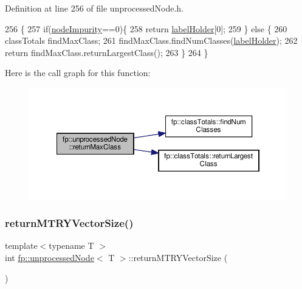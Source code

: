 Definition at line 256 of file unprocessed\+Node.\+h.


\begin{DoxyCode}
256                                            \{
257                     \textcolor{keywordflow}{if}(\hyperlink{classfp_1_1unprocessedNode_a5bb6906b09625f7893bf0ffd512b1714}{nodeImpurity}==0)\{
258                         \textcolor{keywordflow}{return} \hyperlink{classfp_1_1unprocessedNode_a99524f9266d6fcf979f15ef445e629ca}{labelHolder}[0];
259                     \} \textcolor{keywordflow}{else} \{
260                         classTotals findMaxClass;
261                         findMaxClass.findNumClasses(\hyperlink{classfp_1_1unprocessedNode_a99524f9266d6fcf979f15ef445e629ca}{labelHolder});
262                         \textcolor{keywordflow}{return} findMaxClass.returnLargestClass();
263                     \}
264                 \}
\end{DoxyCode}
Here is the call graph for this function\+:\nopagebreak
\begin{figure}[H]
\begin{center}
\leavevmode
\includegraphics[width=350pt]{classfp_1_1unprocessedNode_af038553809a2e6d1cbe04adaba1c6b21_cgraph}
\end{center}
\end{figure}
\mbox{\label{classfp_1_1unprocessedNode_a208170fb33171f64c83839abbf300705}} 
\subsubsection{\texorpdfstring{return\+M\+T\+R\+Y\+Vector\+Size()}{returnMTRYVectorSize()}}
{\footnotesize\ttfamily template$<$typename T $>$ \\
int \hyperlink{classfp_1_1unprocessedNode}{fp\+::unprocessed\+Node}$<$ T $>$\+::return\+M\+T\+R\+Y\+Vector\+Size (\begin{DoxyParamCaption}{ }\end{DoxyParamCaption})\hspace{0.3cm}{\ttfamily [inline]}}



